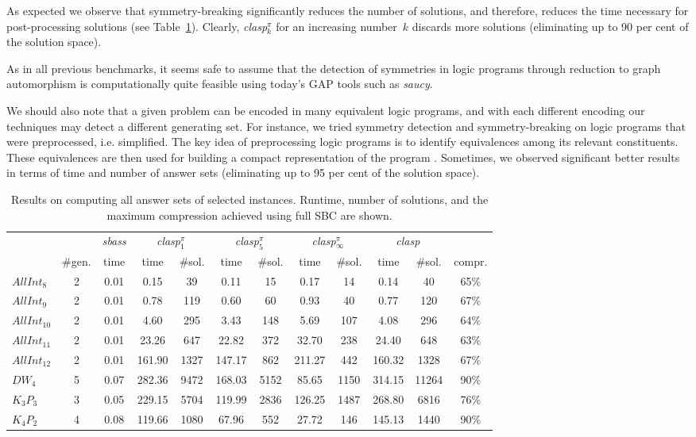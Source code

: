 \documentclass[envcountsame]{llncs}
\newcommand{\systemname}[1]{\emph{#1}}
\begin{document}
As expected we observe that symmetry-breaking significantly reduces the number of solutions, and therefore, reduces the time necessary for post-processing solutions (see Table~\ref{tab:models}). Clearly, \systemname{clasp}$_k^\pi$ for an increasing number~$k$ discards more solutions (eliminating up to 90 per cent of the solution space).

As in all previous benchmarks, it seems safe to assume that the detection of symmetries in logic programs through reduction to graph automorphism is computationally quite feasible using today's GAP tools such as \systemname{saucy}.

We should also note that a given problem can be encoded in many equivalent logic programs, and with each different encoding our techniques may detect a different generating set. For instance, we tried symmetry detection and symmetry-breaking on logic programs that were preprocessed, i.e. simplified. The key idea of preprocessing logic programs is to identify equivalences among its relevant constituents. These equivalences are then used for building a compact representation of the program \cite{gekanesc08a}. Sometimes, we observed significant better results in terms of time and number of answer sets (eliminating up to 95 per cent of the solution space).
\begin{table}
\caption{Results on computing all answer sets of selected instances. Runtime, number of solutions, and the maximum compression achieved using full SBC are shown.\label{tab:models}}
\centering
\begin{tabular}{lccccccccccc}
\hline\noalign{\smallskip}
 & & \systemname{sbass} & \multicolumn{2}{c}{\systemname{clasp}$_1^\pi$} & \multicolumn{2}{c}{\systemname{clasp}$_5^\pi$} & \multicolumn{2}{c}{\systemname{clasp}$_\infty^\pi$} & \multicolumn{2}{c}{\systemname{clasp}} & \\
  & \#gen. & time & time & \#sol. & time & \#sol. & time & \#sol. & time & \#sol. & compr.\\
\noalign{\smallskip}
\hline
\noalign{\smallskip}
$AllInt_{8}$  & 2 & 0.01 &   0.15 & 39   &   0.11 & 15   &   0.17 & 14   &   0.14 & 40    &65\%\\
$AllInt_{9}$  & 2 & 0.01 &   0.78 & 119  &   0.60 & 60   &   0.93 & 40   &   0.77 & 120   &67\%\\
$AllInt_{10}$ & 2 & 0.01 &   4.60 & 295  &   3.43 & 148  &   5.69 & 107  &   4.08 & 296   &64\%\\
$AllInt_{11}$ & 2 & 0.01 &  23.26 & 647  &  22.82 & 372  &  32.70 & 238  &  24.40 & 648   &63\%\\
$AllInt_{12}$ & 2 & 0.01 & 161.90 & 1327 & 147.17 & 862  & 211.27 & 442  & 160.32 & 1328  &67\%\\
$DW_4$        & 5 & 0.07 & 282.36 & 9472 & 168.03 & 5152 &  85.65 & 1150 & 314.15 & 11264 &90\%\\
$K_3P_3$      & 3 & 0.05 & 229.15 & 5704 & 119.99 & 2836 & 126.25 & 1487 & 268.80 & 6816  &76\%\\
$K_4P_2$      & 4 & 0.08 & 119.66 & 1080 &  67.96 & 552  &  27.72 & 146  & 145.13 & 1440  &90\%\\
\hline
\end{tabular}
\end{table}
\end{document}
